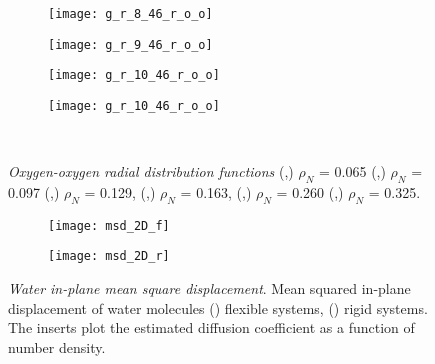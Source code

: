 \documentclass[12pt]{article}
\begin{document}
\begin{figure}[htbp!]
  \begin{subfigure}[b]{0.15\textwidth}
    \texttt{[image: g\_r\_8\_46\_r\_o\_o]}
    \vspace{-15pt} \caption{}
    \label{fig:rg_8_r}
  \end{subfigure}
   \begin{subfigure}[b]{0.15\textwidth}
  \texttt{[image: g\_r\_9\_46\_r\_o\_o]}
    \vspace{-15pt} \caption{}
    \label{fig:rg_9_r}
  \end{subfigure}
  \begin{subfigure}[b]{0.15\textwidth}
    \texttt{[image: g\_r\_10\_46\_r\_o\_o]}
     \vspace{-15pt} \caption{}
    \label{fig:rg_12_r}
  \end{subfigure}
  \begin{subfigure}[b]{0.15\textwidth}
    \texttt{[image: g\_r\_10\_46\_r\_o\_o]}
    \vspace{-15pt} \caption{}
    \label{fig:rg_14_r}
  \end{subfigure}\\
  \caption{\textit{Oxygen-oxygen radial distribution functions} (\protect{},\protect{})  \(\rho_N\) = 0.065 (\protect{},\protect{}) \(\rho_N\) = 0.097 (\protect{},\protect{}) \(\rho_N\) = 0.129, (\protect{},\protect{}) \(\rho_N\) = 0.163, (\protect{},\protect{}) \(\rho_N\) = 0.260 (\protect{},\protect{}) \(\rho_N\) = 0.325.}
  \label{fig:gr}
\end{figure}

\begin{figure}[h!]
	\centering
	\begin{subfigure}[b]{0.49\textwidth}
    \texttt{[image: msd\_2D\_f]}
     \vspace{-15pt} \caption{}
    \label{fig:msd_f}
  \end{subfigure}
  \begin{subfigure}[b]{0.49\textwidth}
    \texttt{[image: msd\_2D\_r]}
     \vspace{-15pt} \caption{}
    \label{fig:msd_r}
  \end{subfigure}
	\caption{\textit{Water in-plane mean square displacement}. Mean squared in-plane displacement of water molecules (\protect{}) flexible systems, (\protect{}) rigid systems. The inserts plot the estimated diffusion coefficient as a function of number density.}
	\label{fig:msd_both}
\end{figure}
\end{document}
